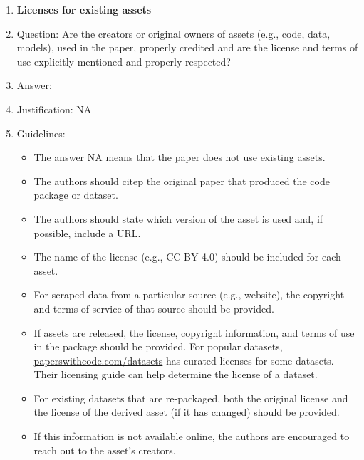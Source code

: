 \documentclass{article}
\begin{document}
\begin{enumerate}
\item {\bf Licenses for existing assets}
    \item[] Question: Are the creators or original owners of assets (e.g., code, data, models), used in the paper, properly credited and are the license and terms of use explicitly mentioned and properly respected?
    \item[] Answer: \answerYes{} %
    \item[] Justification: NA
    \item[] Guidelines:
    \begin{itemize}
        \item The answer NA means that the paper does not use existing assets.
        \item The authors should citep the original paper that produced the code package or dataset.
        \item The authors should state which version of the asset is used and, if possible, include a URL.
        \item The name of the license (e.g., CC-BY 4.0) should be included for each asset.
        \item For scraped data from a particular source (e.g., website), the copyright and terms of service of that source should be provided.
        \item If assets are released, the license, copyright information, and terms of use in the package should be provided. For popular datasets, \url{paperswithcode.com/datasets} has curated licenses for some datasets. Their licensing guide can help determine the license of a dataset.
        \item For existing datasets that are re-packaged, both the original license and the license of the derived asset (if it has changed) should be provided.
        \item If this information is not available online, the authors are encouraged to reach out to the asset's creators.
    \end{itemize}


\end{enumerate}
\end{document}
